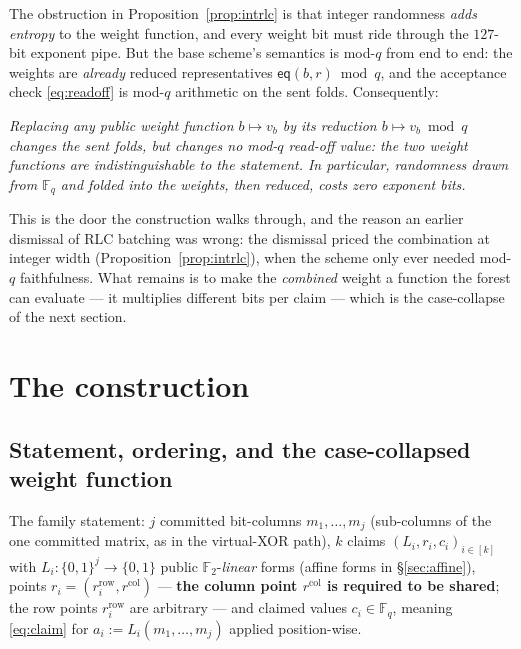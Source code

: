 \documentclass[11pt]{article}
\newcommand{\F}{\mathbb{F}}
\newcommand{\Ftwo}{\F_2}
\newcommand{\Fq}{\F_q}                 %
\newcommand{\bits}{\{0,1\}}
\newcommand{\eq}{\mathsf{eq}}
\theoremstyle{plain}
\theoremstyle{definition}
\theoremstyle{remark}
\begin{document}
The obstruction in Proposition~\ref{prop:intrlc} is that integer randomness
\emph{adds entropy} to the weight function, and every weight bit must ride
through the $127$-bit exponent pipe. But the base scheme's semantics is
mod-$q$ from end to end: the weights are \emph{already} reduced
representatives $\eq(b,r)\bmod q$, and the acceptance check
\eqref{eq:readoff} is mod-$q$ arithmetic on the sent folds. Consequently:

\begin{center}
\begin{minipage}{0.92\textwidth}\itshape
Replacing any public weight function $b\mapsto v_b$ by its reduction
$b\mapsto v_b \bmod q$ changes the sent folds, but changes no mod-$q$ read-off
value: the two weight functions are indistinguishable to the statement. In
particular, randomness drawn from $\Fq$ and folded into the weights, then
reduced, costs \emph{zero} exponent bits.
\end{minipage}
\end{center}

\noindent This is the door the construction walks through, and the reason an
earlier dismissal of RLC batching was wrong: the dismissal priced the
combination at integer width (Proposition~\ref{prop:intrlc}), when the scheme
only ever needed mod-$q$ faithfulness. What remains is to make the
\emph{combined} weight a function the forest can evaluate --- it multiplies
different bits per claim --- which is the case-collapse of the next section.

\section{The construction}\label{sec:constr}

\subsection{Statement, ordering, and the case-collapsed weight function}\label{sec:weights}

The family statement: $j$ committed bit-columns $m_1,\dots,m_j$ (sub-columns
of the one committed matrix, as in the virtual-XOR path), $k$ claims
$(L_i, r_i, c_i)_{i\in[k]}$ with $L_i:\bits^{j}\to\bits$ public
$\Ftwo$-\emph{linear} forms (affine forms in \S\ref{sec:affine}), points
$r_i=(r_i^{\mathrm{row}}, r^{\mathrm{col}})$ --- \textbf{the column point
$r^{\mathrm{col}}$ is required to be shared}; the row points
$r_i^{\mathrm{row}}$ are arbitrary --- and claimed values $c_i\in\Fq$, meaning
\eqref{eq:claim} for $a_i:=L_i(m_1,\dots,m_j)$ applied position-wise.
\end{document}
